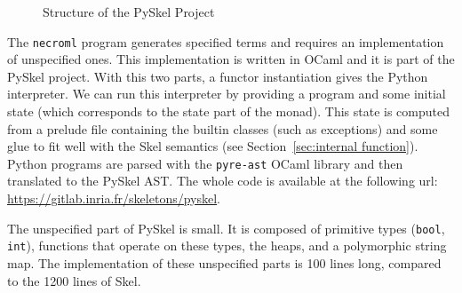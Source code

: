 \documentclass[submission,copyright,creativecommons]{eptcs}
\begin{document}
\begin{figure}[ht!]
  \centering
  \caption{\label{fig:pyskel}Structure of the PySkel Project}
\end{figure}

The \texttt{necroml} program generates specified terms and requires an implementation of unspecified ones.
This implementation is written in OCaml and it is part of the PySkel project.
With this two parts, a functor instantiation gives the Python interpreter.
We can run this interpreter by providing a program and some initial state (which
corresponds to the state part of the monad).
This state is computed from a prelude file containing the builtin classes (such as exceptions) and some glue to fit well with the Skel semantics (see Section~\vref{sec:internal function}).
Python programs are parsed with the \texttt{pyre-ast} OCaml library and then translated to the PySkel AST.
The whole code is available at the following url: \href{https://gitlab.inria.fr/skeletons/pyskel}{\url{https://gitlab.inria.fr/skeletons/pyskel}}.

The unspecified part of PySkel is small.
It is composed of primitive types (\texttt{bool}, \texttt{int}), functions that
operate on these types, the heaps, and a polymorphic string map.
The implementation of these unspecified parts is 100 lines long, compared to the 1200 lines of Skel.
\end{document}
